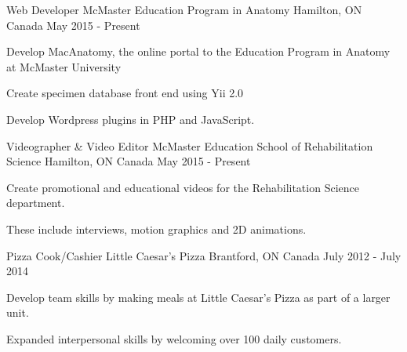 


\begin{cventries}


\cventry
{Web Developer} %
{McMaster Education Program in Anatomy} %
{Hamilton, ON Canada} %
{May 2015 - Present} %
{ %
\begin{cvitems}
\item {Develop MacAnatomy, the online portal to the Education Program in 
Anatomy at McMaster University}
\item {Create specimen database front end using Yii 2.0}
\item {Develop Wordpress plugins in PHP and JavaScript.}
\end{cvitems}
}


\cventry
{Videographer \& Video Editor} %
{McMaster Education School of Rehabilitation Science} %
{Hamilton, ON Canada} %
{May 2015 - Present} %
{ %
\begin{cvitems}
\item {Create promotional and educational videos for the Rehabilitation Science 
department.}
\item {These include interviews, motion graphics and 2D animations.}
\end{cvitems}
}


\cventry
{Pizza Cook/Cashier} %
{Little Caesar's Pizza} %
{Brantford, ON Canada} %
{July 2012 - July 2014} %
{ %
\begin{cvitems}
\item {Develop team skills by making meals at Little Caesar's Pizza as part of 
a larger unit.}
\item {Expanded interpersonal skills by welcoming over 100 daily customers.}
\end{cvitems} 
}


\end{cventries}
